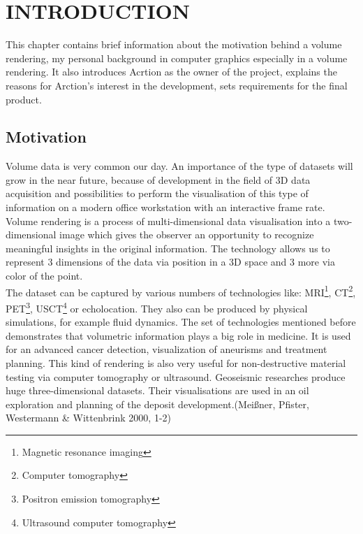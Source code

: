 \documentclass[twoside, english, 11pt]{report}
\begin{document}
\newpage

\tableofcontents

\chapter{INTRODUCTION}
This chapter contains brief information about the motivation behind a volume rendering, my personal background in computer graphics especially in a volume rendering. It also introduces Acrtion as the owner of the project, explains the reasons for Arction's interest in the development, sets requirements for the final product.
\section{Motivation}

Volume data is very common our day. An importance of the type of datasets will grow in the near future, because of development in the field of 3D data acquisition and possibilities to perform the visualisation of this type of information on a modern office workstation with an interactive frame rate.\\

Volume rendering is a process of multi-dimensional data visualisation into a two-dimensional image which gives the observer an opportunity to recognize meaningful insights in the original information. The technology allows us to represent 3 dimensions of the data via position in a 3D space and 3 more via color of the point.\\

The dataset can be captured by various numbers of technologies like: MRI\footnote{Magnetic resonance imaging}, CT\footnote{Computer tomography}, PET\footnote{Positron emission tomography}, USCT\footnote{Ultrasound computer tomography} or echolocation. They also can be produced by physical simulations, for example fluid dynamics. The set of technologies mentioned before demonstrates that volumetric information plays a big role in medicine. It is used for an advanced cancer detection, visualization of aneurisms and treatment planning. This kind of rendering is also very useful for non-destructive material testing via computer tomography or ultrasound. Geoseismic researches produce huge three-dimensional datasets. Their visualisations are used in an oil exploration and planning of the deposit development.(Meißner, Pfister, Westermann \& Wittenbrink 2000, 1-2)\\
\end{document}
